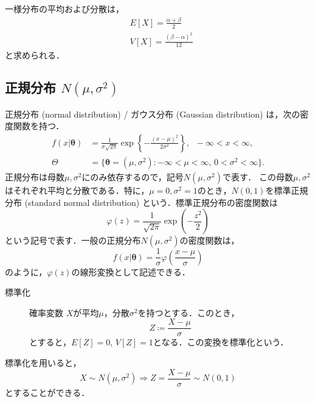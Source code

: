 \documentclass{jsreport}
\begin{document}
一様分布の平均および分散は，
\begin{align}
  &E[X] = \frac{\alpha + \beta}{2} \nonumber \\
  &V[X] = \frac{(\beta - \alpha)^2}{12} \nonumber
\end{align}
と求められる．

\subsection{正規分布 $N(\mu, \sigma^2)$}
正規分布 (normal distribution) / ガウス分布 (Gaussian distribution) は，次の密度関数を持つ．
\begin{align}
  f(x | \bm{\theta}) &= \frac{1}{\sigma \sqrt{2\pi}} \exp\left\{- \frac{(x - \mu)^2}{2 \sigma^2} \right\}, \; \; -\infty < x < \infty, \nonumber \\
  \Theta &= \{\bm{\theta} = (\mu, \sigma^2) : -\infty < \mu < \infty, \, 0 < \sigma^2 < \infty\}. \nonumber
\end{align}
正規分布は母数$\mu, \sigma^2$にのみ依存するので，記号$N(\mu, \sigma^2)$で表す．
この母数$\mu, \sigma^2$はそれぞれ平均と分散である．特に，$\mu = 0, \sigma^2 = 1$のとき，$N(0,1)$を標準正規分布 (standard normal distribution) という．標準正規分布の密度関数は
\begin{equation}
  \varphi(z) = \frac{1}{\sqrt{2\pi}} \exp\left(- \frac{z^2}{2}\right) \nonumber
\end{equation}
という記号で表す．一般の正規分布$N(\mu, \sigma^2)$の密度関数は，
\begin{equation}
  f(x | \bm{\theta}) = \frac{1}{\sigma} \varphi\left(\frac{x - \mu}{\sigma}\right) \nonumber
\end{equation}
のように，$\varphi(z)$の線形変換として記述できる．

\begin{description}
  \item[標準化]
  確率変数 $X$が平均$\mu$，分散$\sigma^2$を持つとする．このとき，
  \begin{equation}
    Z \coloneqq \frac{X - \mu}{\sigma} \nonumber
  \end{equation}
  とすると，$E[Z] = 0, \, V[Z] = 1$となる．この変換を標準化という．
\end{description}

標準化を用いると，
\begin{equation}
  X \sim N(\mu, \sigma^2) \Longrightarrow Z = \frac{X - \mu}{\sigma} \sim N(0, 1) \nonumber
\end{equation}
とすることができる．
\end{document}
